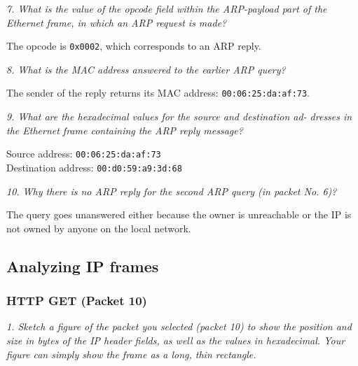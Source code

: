 \textit{7. What is the value of the opcode field within the ARP-payload part of the Ethernet frame, in which an ARP request is made?}

The opcode is \texttt{0x0002}, which corresponds to an ARP reply.

\textit{8. What is the MAC address answered to the earlier ARP query?}

The sender of the reply returns its MAC address: \texttt{00:06:25:da:af:73}.

\textit{9. What are the hexadecimal values for the source and destination ad- dresses in the Ethernet frame containing the ARP reply message?}

Source address: \texttt{00:06:25:da:af:73} \\
Destination address: \texttt{00:d0:59:a9:3d:68}

\textit{10. Why there is no ARP reply for the second ARP query (in packet No. 6)?}

The query goes unanswered either because the owner is unreachable or the IP is not owned by anyone on the local network.

\pagebreak
\subsection{Analyzing IP frames}
\subsubsection{HTTP GET (Packet 10)}
\textit{1. Sketch a figure of the packet you selected (packet 10) to show the position and size in bytes of the IP header fields, as well as the values in hexadecimal. Your figure can simply show the frame as a long, thin rectangle.}

